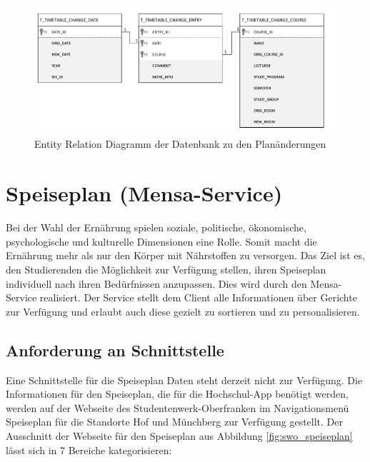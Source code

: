 \begin{figure}[H]
\centering
\includegraphics[width=\pictureWidth cm + 2.5 cm]{Bilder/ER/TimeTableChange_ER.pdf}
\caption{Entity Relation Diagramm der Datenbank zu den Planänderungen\label{fig:timetableER}\protect\footnotemark}
\end{figure}

\section{Speiseplan (Mensa-Service)}
\label{sec:mensa}
Bei der Wahl der Ernährung spielen soziale, politische, ökonomische, psychologische und kulturelle Dimensionen eine Rolle. Somit macht die Ernährung mehr als nur den Körper mit Nährstoffen zu versorgen. 
Das Ziel ist es, den Studierenden die Möglichkeit zur Verfügung stellen, ihren Speiseplan individuell nach ihren Bedürfnissen anzupassen. Dies wird durch den Mensa-Service realisiert. Der Service stellt dem Client alle Informationen über Gerichte zur Verfügung und erlaubt auch diese gezielt zu sortieren und zu personalisieren.

\subsection*{Anforderung an Schnittstelle}
\label{sec:mensa_anforderung}
Eine Schnittstelle für die Speiseplan Daten steht derzeit nicht zur Verfügung. Die Informationen für den Speiseplan, die für die Hochschul-App benötigt werden, werden auf der Webseite des Studentenwerk-Oberfranken im Navigationsmenü Speiseplan für die Standorte Hof und Münchberg zur Verfügung gestellt. Der Ausschnitt der Webseite für den Speiseplan aus Abbildung \ref{fig:swo_speiseplan} lässt sich in 7 Bereiche kategorisieren:

